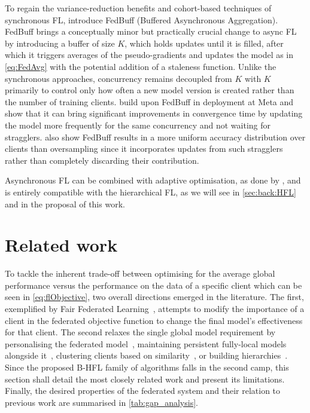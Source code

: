 To regain the variance-reduction benefits and cohort-based techniques of synchronous FL, \citet{FedBuff} introduce FedBuff (Buffered Asynchronous Aggregation). FedBuff brings a conceptually minor but practically crucial change to async FL by introducing a buffer of size $K$, which holds updates until it is filled, after which it triggers averages of the pseudo-gradients and updates the model as in \cref{eq:FedAvg} with the potential addition of a staleness function. Unlike the synchronous approaches, concurrency remains decoupled from $K$ with $K$ primarily to control only how often a new model version is created rather than the number of training clients. \citet{PAPAYA} build upon FedBuff in deployment at Meta and show that it can bring significant improvements in convergence time by updating the model more frequently for the same concurrency and not waiting for stragglers. \citet{PAPAYA} also show FedBuff results in a more uniform accuracy distribution over clients than oversampling since it incorporates updates from such stragglers rather than completely discarding their contribution.

Asynchronous FL can be combined with adaptive optimisation, as done by \citet{PAPAYA}, and is entirely compatible with the hierarchical FL, as we will see in \cref{sec:back:HFL} and in the proposal of this work.

\section{Related work}\label{sec:back:related_work}

To tackle the inherent trade-off between optimising for the average global performance versus the performance on the data of a specific client which can be seen in \cref{eq:flObjective}, two overall directions emerged in the literature. The first, exemplified by Fair Federated Learning~\citep{QFedAvg}, attempts to modify the importance of a client in the federated objective function to change the final model's effectiveness for that client. The second relaxes the single global model requirement by personalising the federated model~\citep{SalvagingFL,TowardsPersonalisedFL,FLwithNonIID}, maintaining persistent fully-local models alongside it~\citep{Ditto}, clustering clients based on similarity~\citep{ThreeApproachesMansour,AnEfficientFrameworkForClusteredFL}, or building hierarchies~\citep{Client-Edge-CloudHierFL,Hier_Het_Cellular}. Since the proposed B-HFL family of algorithms falls in the second camp, this section shall detail the most closely related work and present its limitations. Finally, the desired properties of the federated system and their relation to previous work are summarised in \cref{tab:gap_analysis}.


